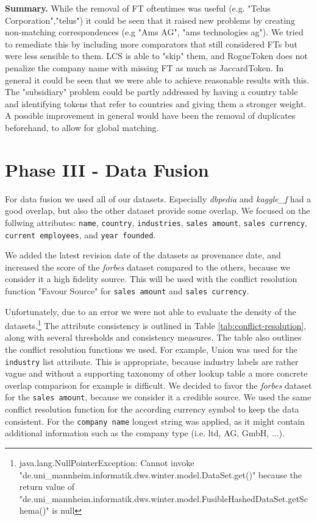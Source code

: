 \documentclass[11pt,titlepage,oneside,openany]{article}
\begin{document}
\textbf{Summary. }While the removal of FT oftentimes was useful (e.g. "Telus Corporation","telus") it could be seen that it raised new problems by creating non-matching correspondences (e.g "Ams AG", "ams technologies ag"). We tried to remediate this by including more comparators that still considered FTs but were less sensible to them. LCS is able to "skip" them, and RogueToken does not penalize the company name with missing FT as much as JaccardToken. In general it could be seen that we were able to achieve reasonable results with this. The "subsidiary" problem could be partly addressed by having a country table and identifying tokens that refer to countries and giving them a stronger weight. A possible improvement in general would have been the removal of duplicates beforehand, to allow for global matching.

\section{Phase III - Data Fusion}
\label{cha:data-fusion}

For data fusion we used all of our datasets. Especially \textit{dbpedia} and \textit{kaggle\_f} had a good overlap, but also the other dataset provide some overlap. We focused on the follwing attributes: {\tt name}, {\tt country}, {\tt industries}, {\tt sales amount}, \mbox{{\tt sales currency}}, {\tt current employees}, and {\tt year founded}.

We added the latest revision date of the datasets as provenance date, and increased the score of the \textit{forbes} dataset compared to the others, because we consider it a high fidelity source. This will be used with the conflict resolution function "Favour Source" for {\tt sales amount} and {\tt sales currency}.

Unfortunately, due to an error we were not able to evaluate the density of the datasets.\footnote{java.lang.NullPointerException: Cannot invoke "de.uni\_mannheim.informatik.dws.winter.model.DataSet.get()" because the return value of "de.uni\_mannheim.informatik.dws.winter.model.FusibleHashedDataSet.getSchema()" is null}%
The attribute consistency is outlined in Table \ref{tab:conflict-resolution}, along with several thresholds and consistency measures. The table also outlines the conflict resolution functions we used. For example, Union was used for the {\tt industry} list attribute. This is appropriate, because industry labels are rather vague and without a supporting taxonomy of other lookup table a more concrete overlap comparison for example is difficult. We decided to favor the \textit{forbes} dataset for the {\tt sales amount}, because we consider it a credible source. We used the same conflict resolution function for the according currency symbol to keep the data consistent. For the {\tt company name} longest string was applied, as it might contain additional information such as the company type (i.e. ltd, AG, GmbH, ...).
\end{document}
